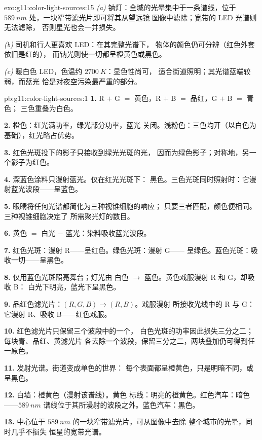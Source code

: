 \begin{solution}{exo:g11:color-light-sources:15}
\emph{(a)} 钠灯：全城的光晕集中于一条谱线，位于
$\qty{589}{nm}$ 处，一块窄带滤光片即可将其从望远镜
图像中滤除；宽带的 LED 光谱则无法滤除，
否则星光也会一并损失。

\emph{(b)} 司机和行人更喜欢 LED：在其完整光谱下，
物体的颜色仍可分辨（红色外套依旧是红的），
而钠光则使一切都呈橙黄色或黑色。

\emph{(c)} 暖白色 LED，色温约 $\qty{2700}{K}$：显色性尚可，
适合街道照明；其光谱蓝端较弱，而蓝光
恰是对夜空污染最严重的部分。
\end{solution}

\begin{solution}{pb:g11:color-light-sources:1}
\textbf{1.} R $+$ G $=$ 黄色，R $+$ B $=$ 品红，G $+$ B $=$ 青色；
三色重叠为白色。

\textbf{2.} 橙色：红光满功率，绿光部分功率，蓝光
关闭。浅粉色：三色均开（以白色为基础），红光略占优势。

\textbf{3.} 红色光斑投下的影子只接收到绿光光斑的光，
因而为绿色影子；对称地，另一个影子为红色。

\textbf{4.} 深蓝色涂料只漫射蓝光。仅在红光光斑下：
黑色。三色光斑同时照射时：它漫射蓝光波段——呈蓝色。

\textbf{5.} 眼睛将任何光谱都简化为三种视锥细胞的响应；
只要三者匹配，颜色便相同。三种视锥细胞决定了
所需聚光灯的数目。

\textbf{6.} 黄色 $=$ 白光 $-$ 蓝光：染料吸收蓝光波段。

\textbf{7.} 红色光斑：漫射 R——呈红色。绿色光斑：漫射 G——
呈绿色。蓝色光斑：吸收一切——呈黑色。

\textbf{8.} 仅用蓝色光斑照亮舞台；灯光由
白色 $\to$ 蓝色。黄色戏服漫射 R 和 G，却吸收 B：
白光下明亮，蓝光下呈黑色。

\textbf{9.} 品红色滤光片：$(R, G, B) \to (R, B)$。戏服漫射
所接收光线中的 R 与 G：它漫射 R、吸收 B——红色戏服。

\textbf{10.} 红色滤光片只保留三个波段中的一个，
白色光斑的功率因此损失三分之二；每块青、品红、黄滤光片
各去除一个波段，保留三分之二，两块叠加仍可得到任一原色。

\textbf{11.} 发射光谱。街道变成单色的世界：
每个表面都呈橙黄色，只是明暗不同，或呈黑色。

\textbf{12.} 白墙：橙黄色（漫射该谱线）。黄色
标线：明亮的橙黄色。红色汽车：暗色——$\qty{589}{nm}$
谱线位于其所漫射的波段之外。蓝色汽车：黑色。

\textbf{13.} 中心位于 $\qty{589}{nm}$ 的一块窄带滤光片，可从图像中去除
整个城市的光晕，同时几乎不损失
恒星的宽带光谱。


\end{solution}
